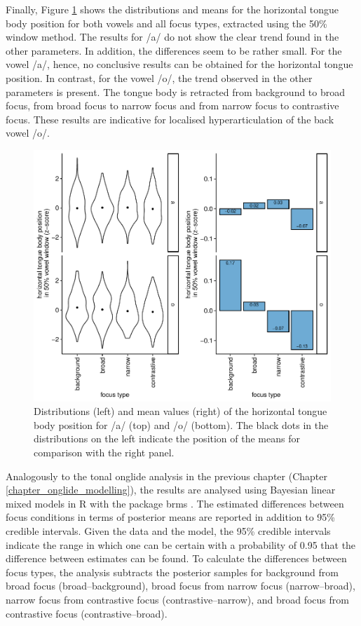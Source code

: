 Finally, Figure \ref{fig:tbox} shows the distributions and means for the horizontal tongue body position for both vowels and all focus types, extracted using the 50\% window method. The results for /a/ do not show the clear trend found in the other parameters. In addition, the differences seem to be rather small. For the vowel /a/, hence, no conclusive results can be obtained for the horizontal tongue position. In contrast, for the vowel /o/, the trend observed in the other parameters is present. The tongue body is retracted from background to broad focus, from broad focus to narrow focus and from narrow focus to contrastive focus. These results are indicative for localised hyperarticulation of the back vowel /o/. 

\begin{figure}
\includegraphics[width=\textwidth]{figures/ch7/tbox.pdf}
\caption[Distributions and mean values of the horizontal tongue body position.]{Distributions (left) and mean values (right) of the horizontal tongue body position for /a/ (top) and /o/ (bottom). The black dots in the distributions on the left indicate the position of the means for comparison with the right panel.}
\label{fig:tbox}
\end{figure}

Analogously to the tonal onglide analysis in the previous chapter (Chapter \ref{chapter_onglide_modelling}), the results are analysed using Bayesian linear mixed models in R \citep{RCoreTeam2018} with the package brms \citep{Buerkner2018}. The estimated differences between focus conditions in terms of posterior means are reported in addition to 95\% credible intervals. Given the data and the model, the 95\% credible intervals indicate the range in which one can be certain with a probability of 0.95 that the difference between estimates can be found. To calculate the differences between focus types, the analysis subtracts the posterior samples for background from broad focus (broad–background), broad focus from narrow focus (narrow–broad), narrow focus from contrastive focus (contrastive–narrow), and broad focus from contrastive focus (contrastive–broad). 

